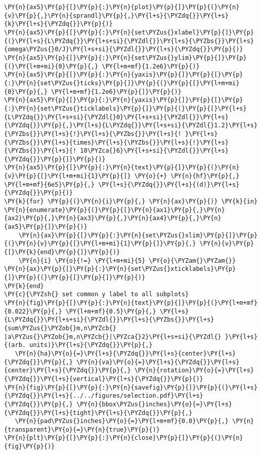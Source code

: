 \begin{Verbatim}[commandchars=\\\{\}]
\PY{n}{ax5}\PY{p}{[}\PY{p}{:}\PY{n}{plot}\PY{p}{]}\PY{p}{(}\PY{n}{ν}\PY{p}{,}\PY{n}{sprandl}\PY{p}{,}\PY{l+s}{\PYZdq{}}\PY{l+s}{k}\PY{l+s}{\PYZdq{}}\PY{p}{)}
\PY{n}{ax5}\PY{p}{[}\PY{p}{:}\PY{n}{set\PYZus{}xlabel}\PY{p}{]}\PY{p}{(}\PY{l+s}{L\PYZdq{}}\PY{l+s+si}{\PYZdl{}}\PY{l+s}{\PYZbs{}}\PY{l+s}{omega\PYZus{}0/J}\PY{l+s+si}{\PYZdl{}}\PY{l+s}{\PYZdq{}}\PY{p}{)}
\PY{n}{ax5}\PY{p}{[}\PY{p}{:}\PY{n}{set\PYZus{}ylim}\PY{p}{]}\PY{p}{(}\PY{l+m+mi}{0}\PY{p}{,} \PY{l+m+mf}{1.2e6}\PY{p}{)}
\PY{n}{ax5}\PY{p}{[}\PY{p}{:}\PY{n}{yaxis}\PY{p}{]}\PY{p}{[}\PY{p}{:}\PY{n}{set\PYZus{}ticks}\PY{p}{]}\PY{p}{(}\PY{p}{[}\PY{l+m+mi}{0}\PY{p}{,} \PY{l+m+mf}{1.2e6}\PY{p}{]}\PY{p}{)}
\PY{n}{ax5}\PY{p}{[}\PY{p}{:}\PY{n}{yaxis}\PY{p}{]}\PY{p}{[}\PY{p}{:}\PY{n}{set\PYZus{}ticklabels}\PY{p}{]}\PY{p}{(}\PY{p}{[}\PY{l+s}{L\PYZdq{}}\PY{l+s+si}{\PYZdl{}0}\PY{l+s+si}{\PYZdl{}}\PY{l+s}{\PYZdq{}}\PY{p}{,}\PY{l+s}{L\PYZdq{}}\PY{l+s+si}{\PYZdl{}1.2}\PY{l+s}{\PYZbs{}}\PY{l+s}{!}\PY{l+s}{\PYZbs{}}\PY{l+s}{! }\PY{l+s}{\PYZbs{}}\PY{l+s}{times}\PY{l+s}{\PYZbs{}}\PY{l+s}{!}\PY{l+s}{\PYZbs{}}\PY{l+s}{! 10\PYZca{}6}\PY{l+s+si}{\PYZdl{}}\PY{l+s}{\PYZdq{}}\PY{p}{]}\PY{p}{)}
\PY{n}{ax5}\PY{p}{[}\PY{p}{:}\PY{n}{text}\PY{p}{]}\PY{p}{(}\PY{n}{ν}\PY{p}{[}\PY{l+m+mi}{1}\PY{p}{]} \PY{o}{+} \PY{n}{hf}\PY{p}{,} \PY{l+m+mf}{6e5}\PY{p}{,} \PY{l+s}{\PYZdq{}}\PY{l+s}{(d)}\PY{l+s}{\PYZdq{}}\PY{p}{)}
\PY{k}{for} \PY{p}{(}\PY{n}{i}\PY{p}{,} \PY{n}{ax}\PY{p}{)} \PY{k}{in} \PY{n}{enumerate}\PY{p}{(}\PY{p}{[}\PY{n}{ax1}\PY{p}{,}\PY{n}{ax2}\PY{p}{,}\PY{n}{ax3}\PY{p}{,}\PY{n}{ax4}\PY{p}{,}\PY{n}{ax5}\PY{p}{]}\PY{p}{)}
    \PY{n}{ax}\PY{p}{[}\PY{p}{:}\PY{n}{set\PYZus{}xlim}\PY{p}{]}\PY{p}{(}\PY{n}{ν}\PY{p}{[}\PY{l+m+mi}{1}\PY{p}{]}\PY{p}{,} \PY{n}{ν}\PY{p}{[}\PY{k}{end}\PY{p}{]}\PY{p}{)}
    \PY{n}{i} \PY{o}{!=} \PY{l+m+mi}{5} \PY{o}{\PYZam{}\PYZam{}} \PY{n}{ax}\PY{p}{[}\PY{p}{:}\PY{n}{set\PYZus{}xticklabels}\PY{p}{]}\PY{p}{(}\PY{p}{[}\PY{p}{]}\PY{p}{)}
\PY{k}{end}
\PY{c}{\PYZsh{} set common y label to all subplots}
\PY{n}{fig}\PY{p}{[}\PY{p}{:}\PY{n}{text}\PY{p}{]}\PY{p}{(}\PY{l+m+mf}{0.022}\PY{p}{,} \PY{l+m+mf}{0.5}\PY{p}{,} \PY{l+s}{L\PYZdq{}}\PY{l+s+si}{\PYZdl{}}\PY{l+s}{\PYZbs{}}\PY{l+s}{sum\PYZus{}\PYZob{}m,n\PYZcb{} |a\PYZus{}\PYZob{}m,n\PYZcb{}|\PYZca{}2}\PY{l+s+si}{\PYZdl{} }\PY{l+s}{(arb. units)}\PY{l+s}{\PYZdq{}}\PY{p}{,}
   \PY{n}{ha}\PY{o}{=}\PY{l+s}{\PYZdq{}}\PY{l+s}{center}\PY{l+s}{\PYZdq{}}\PY{p}{,} \PY{n}{va}\PY{o}{=}\PY{l+s}{\PYZdq{}}\PY{l+s}{center}\PY{l+s}{\PYZdq{}}\PY{p}{,} \PY{n}{rotation}\PY{o}{=}\PY{l+s}{\PYZdq{}}\PY{l+s}{vertical}\PY{l+s}{\PYZdq{}}\PY{p}{)}
\PY{n}{fig}\PY{p}{[}\PY{p}{:}\PY{n}{savefig}\PY{p}{]}\PY{p}{(}\PY{l+s}{\PYZdq{}}\PY{l+s}{../../figures/selection.pdf}\PY{l+s}{\PYZdq{}}\PY{p}{,} \PY{n}{bbox\PYZus{}inches}\PY{o}{=}\PY{l+s}{\PYZdq{}}\PY{l+s}{tight}\PY{l+s}{\PYZdq{}}\PY{p}{,}
   \PY{n}{pad\PYZus{}inches}\PY{o}{=}\PY{l+m+mf}{0.0}\PY{p}{,} \PY{n}{transparent}\PY{o}{=}\PY{n}{true}\PY{p}{)}
\PY{n}{plt}\PY{p}{[}\PY{p}{:}\PY{n}{close}\PY{p}{]}\PY{p}{(}\PY{n}{fig}\PY{p}{)}


\end{Verbatim}
